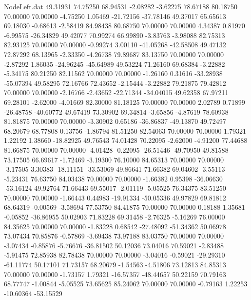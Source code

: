 \begin{filecontents}{NodeLeft.dat}
  49.31931   74.75250   68.94531    -2.08282   -3.62275   78.67188   80.18750   70.00000   70.00000   -4.75250    1.05469  -21.72156  -37.78146
  49.37017   65.65613   69.18030    -0.68613   -2.58419   84.98438   80.68750   70.00000   70.00000    4.34387    0.81970   -6.99575  -26.34829
  49.42077   70.99274   66.99890    -3.83763   -3.98088   82.75313   82.93125   70.00000   70.00000   -0.99274    3.00110  -41.05268  -42.58508
  49.47132   72.87292   68.13965    -2.33350   -4.26738   79.89687   83.13750   70.00000   70.00000   -2.87292    1.86035  -24.96245  -45.64989
  49.53224   71.26160   69.68384    -3.22882   -5.34175   80.21250   82.11562   70.00000   70.00000   -1.26160    0.31616  -33.28938  -55.07394
  49.58295   72.16766   72.43652    -2.15444   -3.22882   79.21875   79.42812   70.00000   70.00000   -2.16766   -2.43652  -22.71344  -34.04015
  49.62358   67.97211   69.28101    -2.62000   -4.01669   82.30000   81.18125   70.00000   70.00000    2.02789    0.71899  -26.48758  -40.60772
  49.67419   73.30902   69.34814    -3.65856   -4.87619   78.60938   81.81875   70.00000   70.00000   -3.30902    0.65186  -36.86837  -49.13870
  49.72497   68.20679   68.77808     0.13756   -1.86794   81.51250   82.54063   70.00000   70.00000    1.79321    1.22192    1.38660  -18.82925
  49.76543   74.01428   70.22095    -2.62000   -4.91200   77.44688   81.66875   70.00000   70.00000   -4.01428   -0.22095  -26.51446  -49.70950
  49.81588   73.17505   66.69617    -1.72469   -3.19300   76.10000   84.65313   70.00000   70.00000   -3.17505    3.30383  -18.11151  -33.53069
  49.86641   71.66382   69.04602    -3.55113   -5.23431   76.63750   84.03438   70.00000   70.00000   -1.66382    0.95398  -36.06630  -53.16124
  49.92764   71.66443   69.55017    -2.01119   -5.05525   76.34375   83.51250   70.00000   70.00000   -1.66443    0.44983  -19.91334  -50.05336
  49.97829   69.81812   68.64319    -0.00569   -3.58694   77.53750   84.41875   70.00000   70.00000    0.18188    1.35681   -0.05852  -36.86955
  50.02903   71.83228   69.31458    -2.76325   -5.16269   76.00000   84.35625   70.00000   70.00000   -1.83228    0.68542  -27.48092  -51.34362
  50.06978   73.07434   70.85876    -0.57869   -3.69438   73.97188   83.03750   70.00000   70.00000   -3.07434   -0.85876   -5.76676  -36.81502
  50.12036   73.04016   70.59021    -2.83488   -5.91475   72.85938   82.78438   70.00000   70.00000   -3.04016   -0.59021  -29.29310  -61.11774
  50.17101   71.73157   68.20679    -1.54563   -4.51806   73.12813   84.85313   70.00000   70.00000   -1.73157    1.79321  -16.57357  -48.44657
  50.22159   70.79163   68.77747    -1.00844   -5.05525   73.65625   85.24062   70.00000   70.00000   -0.79163    1.22253  -10.60364  -53.15529

\end{filecontents}
